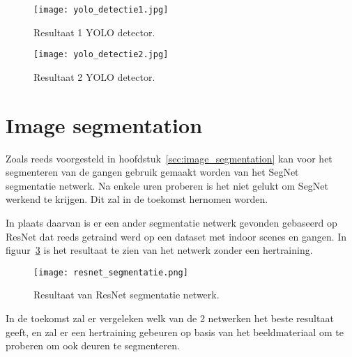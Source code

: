    \begin{figure}[H]
      \centering
      \texttt{[image: yolo\_detectie1.jpg]}
      \caption{Resultaat 1 YOLO detector.}
      \label{fig:yolo_1}
   \end{figure}

   \begin{figure}[!htb]
      \centering
      \texttt{[image: yolo\_detectie2.jpg]}
      \caption{Resultaat 2 YOLO detector.}
      \label{fig:yolo_2}
   \end{figure}

\newpage
\section{Image segmentation}

   Zoals reeds voorgesteld in hoofdstuk~\ref{sec:image_segmentation} kan voor het segmenteren van de gangen gebruik gemaakt worden van het SegNet~\cite{Badrinarayanan} segmentatie netwerk.
   Na enkele uren proberen is het niet gelukt om SegNet werkend te krijgen. Dit zal in de toekomst hernomen worden.

   In plaats daarvan is er een ander segmentatie netwerk gevonden gebaseerd op ResNet dat reeds getraind werd op een dataset met indoor scenes en gangen.
   In figuur~\ref{fig:resnet_seg} is het resultaat te zien van het netwerk zonder een hertraining.

   
   \begin{figure}[!htb]
      \centering
      \texttt{[image: resnet\_segmentatie.png]}
      \caption{Resultaat van ResNet segmentatie netwerk.}
      \label{fig:resnet_seg}
   \end{figure}

   In de toekomst zal er vergeleken welk van de 2 netwerken het beste resultaat geeft, en zal er een hertraining gebeuren op basis van het beeldmateriaal om te proberen om ook deuren te segmenteren.